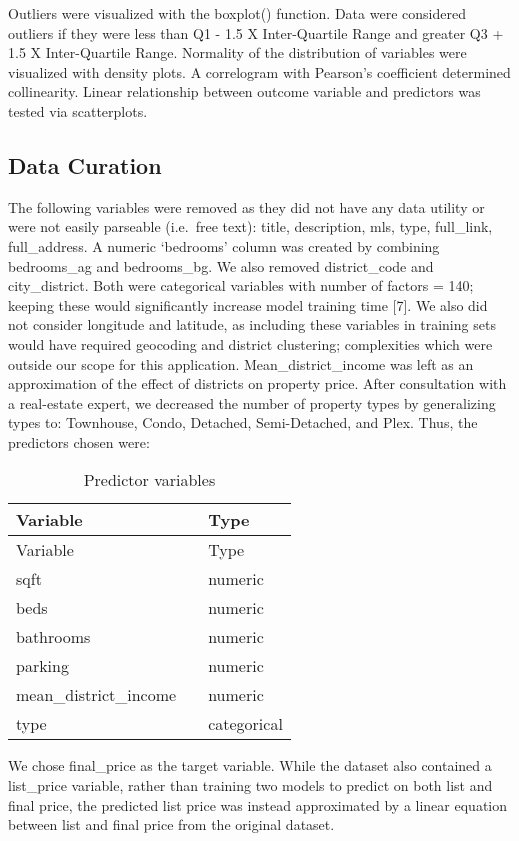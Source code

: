 \documentclass[11pt,]{article}
\begin{document}
Outliers were visualized with the boxplot() function. Data were
considered outliers if they were less than Q1 - 1.5 X Inter-Quartile
Range and greater Q3 + 1.5 X Inter-Quartile Range. Normality of the
distribution of variables were visualized with density plots. A
correlogram with Pearson's coefficient determined collinearity. Linear
relationship between outcome variable and predictors was tested via
scatterplots.

\hypertarget{data-curation}{%
\subsection{Data Curation}\label{data-curation}}

The following variables were removed as they did not have any data
utility or were not easily parseable (i.e.~free text): title,
description, mls, type, full\_link, full\_address. A numeric `bedrooms'
column was created by combining bedrooms\_ag and bedrooms\_bg. We also
removed district\_code and city\_district. Both were categorical
variables with number of factors = 140; keeping these would
significantly increase model training time {[}7{]}. We also did not
consider longitude and latitude, as including these variables in
training sets would have required geocoding and district clustering;
complexities which were outside our scope for this application.
Mean\_district\_income was left as an approximation of the effect of
districts on property price. After consultation with a real-estate
expert, we decreased the number of property types by generalizing types
to: Townhouse, Condo, Detached, Semi-Detached, and Plex. Thus, the
predictors chosen were:

\begin{longtable}[]{@{}lll@{}}
\caption{Predictor variables}\tabularnewline
\toprule
Variable & & Type\tabularnewline
\midrule
\endfirsthead
\toprule
Variable & & Type\tabularnewline
\midrule
\endhead
sqft & & numeric\tabularnewline
beds & & numeric\tabularnewline
bathrooms & & numeric\tabularnewline
parking & & numeric\tabularnewline
mean\_district\_income & & numeric\tabularnewline
type & & categorical\tabularnewline
\bottomrule
\end{longtable}

We chose final\_price as the target variable. While the dataset also
contained a list\_price variable, rather than training two models to
predict on both list and final price, the predicted list price was
instead approximated by a linear equation between list and final price
from the original dataset.
\end{document}
